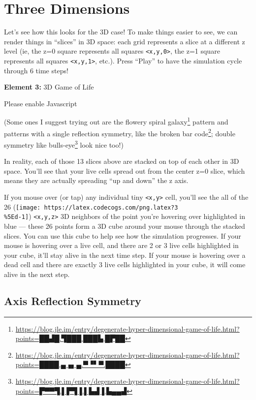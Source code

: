 \documentclass[]{article}
\renewcommand{\href}[2]{#2\footnote{\url{#1}}}
\begin{document}
\hypertarget{three-dimensions}{%
\section{Three Dimensions}\label{three-dimensions}}

Let's see how this looks for the 3D case! To make things easier to see, we can
render things in ``slices'' in 3D space: each grid represents a slice at a
different z level (ie, the z=0 square represents all squares
\texttt{\textless{}x,y,0\textgreater{}}, the z=1 square represents all squares
\texttt{\textless{}x,y,1\textgreater{}}, etc.). Press ``Play'' to have the
simulation cycle through 6 time steps!

\leavevmode\hypertarget{gol3D}{}%
\textbf{Element 3:} 3D Game of Life

\leavevmode\hypertarget{gol3DCont}{}%
Please enable Javascript

(Some ones I suggest trying out are the flowery
\href{https://blog.jle.im/entry/degenerate-hyper-dimensional-game-of-life.html?points=██▟█.▜███.███▙.█▛██}{spiral
galaxy} pattern and patterns with a single reflection symmetry, like the
\href{https://blog.jle.im/entry/degenerate-hyper-dimensional-game-of-life.html?points=████.▄▗▖▄.▀▝▘▀.████}{broken
bar code}; double symmetry like
\href{https://blog.jle.im/entry/degenerate-hyper-dimensional-game-of-life.html?points=▛▀▀▜.▌▛▜▐.▌▙▟▐.▙▄▄▟}{bulls-eye}
look nice too!)

In reality, each of those 13 slices above are stacked on top of each other in 3D
space. You'll see that your live cells spread out from the center z=0 slice,
which means they are actually spreading ``up and down'' the z axis.

If you mouse over (or tap) any individual tiny
\texttt{\textless{}x,y\textgreater{}} cell, you'll see the all of the 26
(\texttt{[image: https://latex.codecogs.com/png.latex?3\\\%5Ed-1]})
\texttt{\textless{}x,y,z\textgreater{}} 3D neighbors of the point you're
hovering over highlighted in blue --- these 26 points form a 3D cube around your
mouse through the stacked slices. You can use this cube to help see how the
simulation progresses. If your mouse is hovering over a live cell, and there are
2 or 3 live cells highlighted in your cube, it'll stay alive in the next time
step. If your mouse is hovering over a dead cell and there are exactly 3 live
cells highlighted in your cube, it will come alive in the next step.

\hypertarget{axis-reflection-symmetry}{%
\subsection{Axis Reflection Symmetry}\label{axis-reflection-symmetry}}
\end{document}
